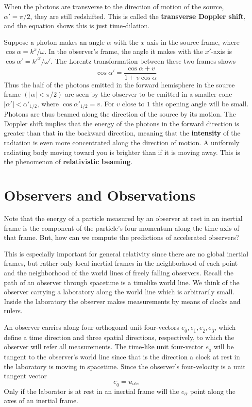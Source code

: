 When the photons are transverse to the direction of motion of the source, $\alpha' = \pi/2$, they are still redshifted. This is called the \textbf{transverse Doppler shift}, and the equation shows this is just time-dilation.

Suppose a photon makes an angle $\alpha$ with the $x$-axis in the source frame, where $\cos\alpha = k^x/\omega$. In the observer's frame, the angle it makes with the $x'$-axis is $\cos\alpha' = {k'}^x/\omega'$. The Lorentz transformation between these two frames shows $$\cos\alpha' = \frac{\cos\alpha + v}{1+v\cos\alpha}$$
Thus the half of the photons emitted in the forward hemisphere in the source frame $(|\alpha| < \pi/2)$ are seen by the observer to be emitted in a smaller cone $|\alpha'| < \alpha'_{1/2}$, where $\cos\alpha'_{1/2} = v$. For $v$ close to $1$ this opening angle will be small. Photons are thus beamed along the direction of the source by its motion. The Doppler shift implies that the energy of the photons in the forward direction is greater than that in the backward direction, meaning that the \textbf{intensity} of the radiation is even more concentrated along the direction of motion. A uniformly radiating body moving toward you is brighter than if it is moving away. This is the phenomenon of \textbf{relativistic beaming}.


\section{Observers and Observations}
\label{sec:Obs}

Note that the energy of a particle measured by an observer at rest in an inertial frame is the component of the particle's four-momentum along the time axis of that frame. But, how can we compute the predictions of accelerated observers?

This is especially important for general relativity since there are no global inertial frames, but rather only local inertial frames in the neighborhood of each point and the neighborhood of the world lines of freely falling observers. Recall the path of an observer through spacetime is a timelike world line. We think of the observer carrying a laboratory along the world line which is arbitrarily small. Inside the laboratory the observer makes measurements by means of clocks and rulers.

An observer carries along four orthogonal unit four-vectors $e_{\hat{0}},e_{\hat{1}},e_{\hat{2}},e_{\hat{3}}$, which define a time direction and three spatial directions, respectively, to which the observer will refer all measurements. The time-like unit four-vector $e_{\hat{0}}$ will be tangent to the observer's world line since that is the direction a clock at rest in the laboratory is moving in spacetime. Since the observer's four-velocity is a unit tangent vector $$e_{\hat{0}} = u_{obs}$$
Only if the laborator is at rest in an inertial frame will the $e_{\hat{\alpha}}$ point along the axes of an inertial frame.

